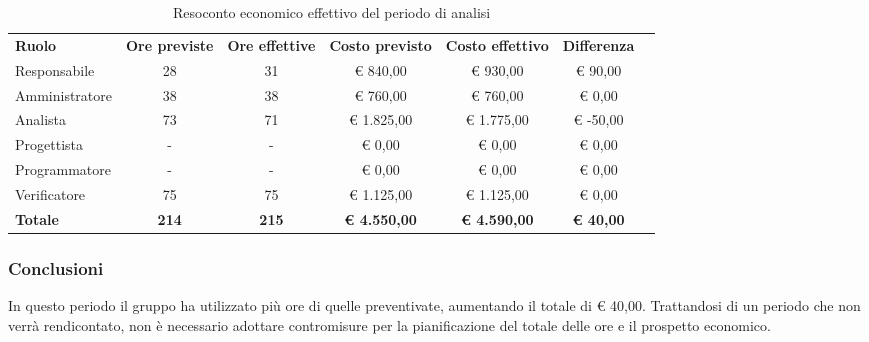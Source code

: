 \documentclass[../piano-di-progetto.tex]{subfiles}
\begin{document}
  \begin{table}[H]
    \centering
    \begin{tabular}{lcccccc}
      \rowcolor{lightgray}
      \textbf{Ruolo}  & \textbf{Ore previste} & \textbf{Ore effettive} & \textbf{Costo previsto} & \textbf{Costo effettivo} & \textbf{Differenza} \\
      Responsabile    & 28                    & 31                     & € 840,00                & € 930,00                 & € 90,00    \\
      Amministratore  & 38                    & 38                     & € 760,00                & € 760,00                 & € 0,00     \\
      Analista        & 73                    & 71                     & € 1.825,00              & € 1.775,00               & € -50,00   \\
      Progettista     & -                     & -                      & € 0,00                  & € 0,00                   & € 0,00     \\
      Programmatore   & -                     & -                      & € 0,00                  & € 0,00                   & € 0,00     \\
      Verificatore    & 75                    & 75                     & € 1.125,00              & € 1.125,00               & € 0,00     \\
      \textbf{Totale} & \textbf{214}          & \textbf{215}           & \textbf{€ 4.550,00}     & \textbf{€ 4.590,00}      & \textbf{€ 40,00}   
      
    \end{tabular}
    \caption{Resoconto economico effettivo del periodo di analisi}
  \end{table}


\subsubsection{Conclusioni}
In questo periodo il gruppo ha utilizzato più ore di quelle preventivate, aumentando il totale di € 40,00. Trattandosi di un periodo che non verrà rendicontato, non è necessario adottare contromisure per la pianificazione del totale delle ore e il prospetto economico.
\end{document}
